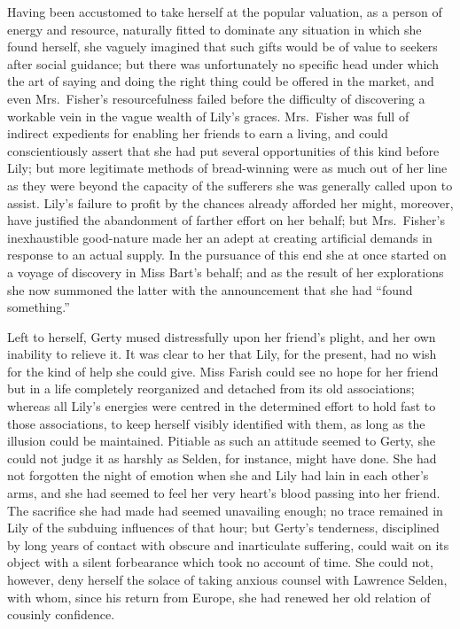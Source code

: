 \documentclass[12pt,a4paper]{book}
\begin{document}
Having been accustomed to take herself at the popular valuation,
as a person of energy and resource, naturally fitted to dominate
any situation in which she found herself, she vaguely imagined
that such gifts would be of value to seekers after social
guidance; but there was unfortunately no specific head under
which the art of saying and doing the right thing could be
offered in the market, and even Mrs.\ Fisher's resourcefulness
failed before the difficulty of discovering a workable vein in
the vague wealth of Lily's graces. Mrs.\ Fisher was full of
indirect expedients for enabling her friends to earn a living,
and could conscientiously assert that she had put several
opportunities of this kind before Lily; but more legitimate
methods of bread-winning were as much out of her line as they
were beyond the capacity of the sufferers she was generally
called upon to assist. Lily's failure to profit by the chances
already afforded her might, moreover, have justified the
abandonment of farther effort on her behalf; but Mrs.\ Fisher's
inexhaustible good-nature made her an adept at creating
artificial demands in response to an actual supply. In the
pursuance of this end she at once started on a voyage of
discovery in Miss Bart's behalf; and as the result of her
explorations she now summoned the latter with the announcement
that she had ``found something.''








Left to herself, Gerty mused distressfully upon her friend's
plight, and her own inability to relieve it. It was clear to her
that Lily, for the present, had no wish for the kind of help she
could give. Miss Farish could see no hope for her friend but in a
life completely reorganized and detached from its old
associations; whereas all Lily's energies were centred in the
determined effort to hold fast to those associations, to keep
herself visibly identified with them, as long as the illusion
could be maintained. Pitiable as such an attitude seemed to
Gerty, she could not judge it as harshly as Selden, for instance,
might have done. She had not forgotten the night of emotion when
she and Lily had lain in each other's arms, and she had seemed to
feel her very heart's blood passing into her friend. The
sacrifice she had made had seemed unavailing enough; no trace
remained in Lily of the subduing influences of that hour; but
Gerty's tenderness, disciplined by long years of contact with
obscure and inarticulate suffering, could wait on its object with
a silent forbearance which took no account of time. She could
not, however, deny herself the solace of taking anxious counsel
with Lawrence Selden, with whom, since his return from Europe,
she had renewed her old relation of cousinly confidence.
\end{document}
